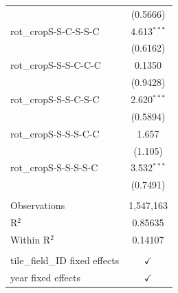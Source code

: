 \begin{table}[htbp]
\begin{tabular}{lc}
                                      & (0.5666)\\   
      rot\_cropS-S-C-S-S-C            & 4.613$^{***}$\\   
                                      & (0.6162)\\   
      rot\_cropS-S-S-C-C-C            & 0.1350\\   
                                      & (0.9428)\\   
      rot\_cropS-S-S-C-S-C            & 2.620$^{***}$\\   
                                      & (0.5894)\\   
      rot\_cropS-S-S-S-C-C            & 1.657\\   
                                      & (1.105)\\   
      rot\_cropS-S-S-S-S-C            & 3.532$^{***}$\\   
                                      & (0.7491)\\   
       \\
      Observations                    & 1,547,163\\  
      R$^2$                           & 0.85635\\  
      Within R$^2$                    & 0.14107\\  
       \\
      tile\_field\_ID fixed effects   & $\checkmark$\\   
      year fixed effects              & $\checkmark$\\   
      \bottomrule
   \end{tabular}
\end{table}


